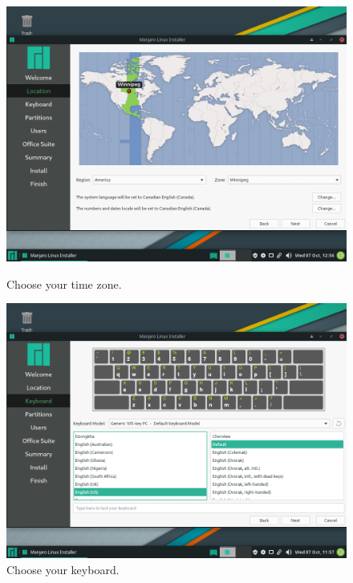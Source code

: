 \documentclass{article}
\begin{document}
\begin{figure}[ht!]
    \centering
    \begin{minipage}{0.5\textwidth}
        \includegraphics[width=.95\linewidth]{images/choose_your_time_zone_I_am_from_winnipeg_but_many_options_exist.png}
        \caption{Choose your time zone.}
        \label{fig:chooseTimeZone}
    \end{minipage}\hfill
    \centering
    \begin{minipage}{0.5\textwidth}
        \includegraphics[width=.95\linewidth]{images/choose_your_keyboard_layout_most_people_have_the_default_but_it_should_be_able_to_be_customized_if_you_have_an_international_keyboard.png}
        \caption{Choose your keyboard.}
        \label{fig:chooseKeyboard}
    \end{minipage}\hfill
    \centering
    \begin{minipage}{0.5\textwidth}

\end{minipage}
\end{figure}
\end{document}

